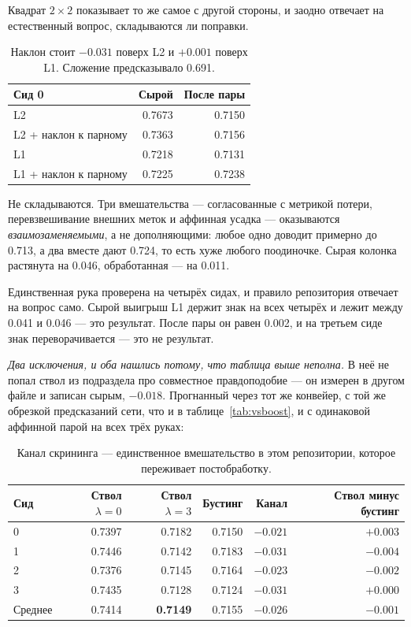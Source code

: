 Квадрат $2\times2$ показывает то же самое с другой стороны, и заодно отвечает на естественный
вопрос, складываются ли поправки.

\begin{table}[htbp]\centering\small
\begin{tabularx}{0.85\textwidth}{@{}Xrr@{}}
\toprule
Сид 0 & Сырой & После пары \\
\midrule
L2                        & 0.7673 & 0.7150 \\
L2 + наклон к парному     & 0.7363 & 0.7156 \\
L1                        & 0.7218 & 0.7131 \\
L1 + наклон к парному     & 0.7225 & 0.7238 \\
\bottomrule
\end{tabularx}
\caption{Наклон стоит $-0.031$ поверх L2 и $+0.001$ поверх L1. Сложение предсказывало 0.691.}
\label{tab:square}
\end{table}

Не складываются. Три вмешательства --- согласованные с метрикой потери, перевзвешивание
внешних меток и аффинная усадка --- оказываются \emph{взаимозаменяемыми}, а не
дополняющими: любое одно доводит примерно до 0.713, а два вместе дают 0.724, то есть хуже
любого поодиночке. Сырая колонка растянута на 0.046, обработанная --- на 0.011.

Единственная рука проверена на четырёх сидах, и правило репозитория отвечает на вопрос само.
Сырой выигрыш L1 держит знак на всех четырёх и лежит между 0.041 и 0.046 --- это результат.
После пары он равен 0.002, и на третьем сиде знак переворачивается --- это не результат.

\emph{Два исключения, и оба нашлись потому, что таблица выше неполна.} В неё не попал ствол
из подраздела про совместное правдоподобие --- он измерен в другом файле и записан сырым,
$-0.018$. Прогнанный через тот же конвейер, с той же обрезкой предсказаний сети, что и в
таблице~\ref{tab:vsboost}, и с одинаковой аффинной парой на всех трёх руках:

\begin{table}[htbp]\centering\small
\begin{tabularx}{\textwidth}{@{}Xrrrrr@{}}
\toprule
Сид & Ствол $\lambda=0$ & Ствол $\lambda=3$ & Бустинг & Канал & Ствол минус бустинг \\
\midrule
0 & 0.7397 & 0.7182 & 0.7150 & $-0.021$ & $+0.003$ \\
1 & 0.7446 & 0.7142 & 0.7183 & $-0.031$ & $-0.004$ \\
2 & 0.7376 & 0.7145 & 0.7164 & $-0.023$ & $-0.002$ \\
3 & 0.7435 & 0.7128 & 0.7124 & $-0.031$ & $+0.000$ \\
\midrule
Среднее & 0.7414 & \textbf{0.7149} & 0.7155 & $\mathbf{-0.026}$ & $-0.001$ \\
\bottomrule
\end{tabularx}
\caption{Канал скрининга --- единственное вмешательство в этом репозитории, которое переживает
постобработку.}
\label{tab:trunkpost}
\end{table}


